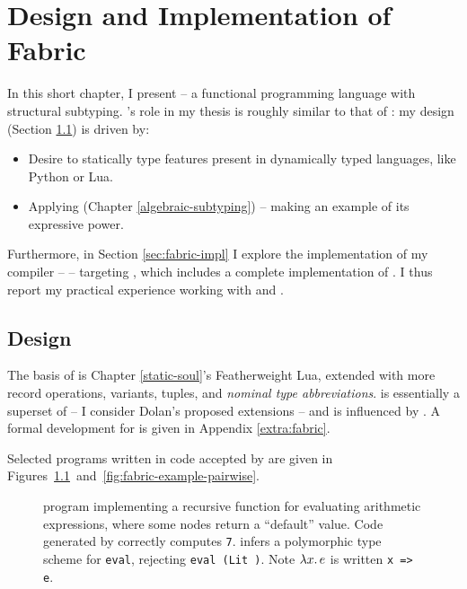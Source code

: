 \chapter{Design and Implementation of Fabric}
\label{fabric}

In this short chapter, I present \textbf{\fabric{}} -- a functional programming language with structural subtyping. 
\fabric{}'s role in my thesis is roughly similar to that of \mlsub{} \cite{dolan-thesis}: my design (Section \ref{sec:fabric-design}) is driven by: \begin{itemize}
    \item Desire to statically type features present in dynamically typed languages, like Python or Lua.
    \item Applying \inference{} (Chapter \ref{algebraic-subtyping}) -- making \fabric{} an example of its expressive power.
\end{itemize}
Furthermore, in Section \ref{sec:fabric-impl} I explore the implementation of my \fabric{} compiler -- \compiler{} -- targeting \wasm{}, which includes a complete implementation of \inference{}. I thus report my practical experience working with \wasm{} and \inference{}.

\section{Design}
\label{sec:fabric-design}

The basis of \fabric{} is Chapter \ref{static-soul}'s Featherweight Lua, extended with more record operations, variants, tuples, and \emph{nominal type abbreviations}. \fabric{} is essentially a superset of \mlsub{} \cite{mlsub} -- I consider Dolan's proposed extensions \cite[Chapter~9]{dolan-thesis} -- and is influenced by \mlstruct{} \cite{mlstruct}. 
A formal development for \fabric{} is given in Appendix \ref{extra:fabric}.


Selected \fabric{} programs written in code accepted by \compiler{} are given in Figures~\ref{fig:fabric-example-eval}~and~\ref{fig:fabric-example-pairwise}.


\begin{figure}[p]
    \centering
    
    \caption{\fabric{} program implementing a recursive function for evaluating arithmetic expressions, where some nodes return a \enquote{default} value. Code generated by \compiler{} correctly computes \texttt{7}. \inference{} infers a polymorphic type scheme for \texttt{eval}, \eg{} rejecting \texttt{eval (Lit {})}. Note $\lambda {x} \ldotp e$ is written \texttt{x => e}.}
    \label{fig:fabric-example-eval}
\end{figure}

